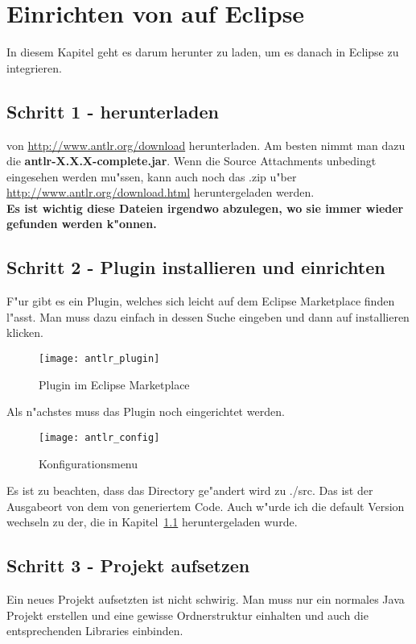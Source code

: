 
\section{Einrichten von \antlr auf Eclipse}
In diesem Kapitel geht es darum \antlr herunter zu laden, um es danach in Eclipse zu integrieren. 

\subsection{Schritt 1 - \antlr herunterladen}
\label{sec:step1}
\antlr von \href{http://www.antlr.org/download}{http://www.antlr.org/download} herunterladen. Am besten nimmt man dazu die \textbf{antlr-X.X.X-complete.jar}. Wenn die Source Attachments unbedingt eingesehen werden mu"ssen, kann auch noch das .zip u"ber \href{http://www.antlr.org/download.html}{http://www.antlr.org/download.html} heruntergeladen werden.\\
\textbf{Es ist wichtig diese Dateien irgendwo abzulegen, wo sie immer wieder gefunden werden k"onnen.}

\subsection{Schritt 2 - \antlr Plugin installieren und einrichten}
\label{sec:step2}
F"ur \antlr gibt es ein Plugin, welches sich leicht auf dem Eclipse Marketplace finden l"asst. Man muss dazu einfach \antlr in dessen Suche eingeben und dann auf installieren klicken.

\begin{figure}[H]
	\centering
	\texttt{[image: antlr\_plugin]}
	\caption{\antlr Plugin im Eclipse Marketplace}
\end{figure}

Als n"achstes muss das Plugin noch eingerichtet werden. 

\begin{figure}[H]
	\centering
	\texttt{[image: antlr\_config]}
	\caption{\antlr Konfigurationsmenu}
\end{figure}

Es ist zu beachten, dass das Directory ge"andert wird zu ./src. Das ist der Ausgabeort von dem von \antlr generiertem Code. Auch w"urde ich die default Version wechseln zu der, die in Kapitel~\ref{sec:step1} heruntergeladen wurde. 

\subsection{Schritt 3 - Projekt aufsetzen}
Ein neues Projekt aufsetzten ist nicht schwirig. Man muss nur ein normales Java Projekt erstellen und eine gewisse Ordnerstruktur einhalten und auch die entsprechenden Libraries einbinden. 

